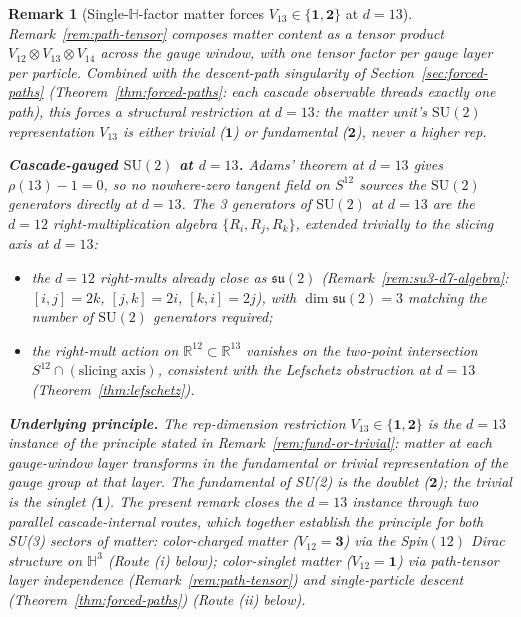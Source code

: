 \documentclass[12pt,a4paper]{article}
\newtheorem{remark}[theorem]{Remark}
\begin{document}
\begin{remark}[Single-$\mathbb{H}$-factor matter forces $V_{13}\in\{\mathbf{1},\mathbf{2}\}$ at $d=13$]\label{rem:single-h-factor}
Remark~\ref{rem:path-tensor} composes matter content as a tensor product
$V_{12}\otimes V_{13}\otimes V_{14}$ across the gauge window, with one
tensor factor per gauge layer per particle. Combined with the
descent-path singularity of Section~\ref{sec:forced-paths}
(Theorem~\ref{thm:forced-paths}: each cascade observable threads exactly
one path), this forces a structural restriction at $d=13$: the matter
unit's $\mathrm{SU}(2)$ representation $V_{13}$ is either trivial
($\mathbf{1}$) or fundamental ($\mathbf{2}$), never a higher rep.

\medskip\noindent\textbf{Cascade-gauged $\mathrm{SU}(2)$ at $d=13$.}
Adams' theorem at $d=13$ gives $\rho(13)-1=0$, so no nowhere-zero
tangent field on $S^{12}$ sources the $\mathrm{SU}(2)$ generators
directly at $d=13$. The 3 generators of $\mathrm{SU}(2)$ at $d=13$ are
the $d=12$ right-multiplication algebra $\{R_i,R_j,R_k\}$, extended
trivially to the slicing axis at $d=13$:
\begin{itemize}
\item the $d=12$ right-mults already close as $\mathfrak{su}(2)$
(Remark~\ref{rem:su3-d7-algebra}: $[i,j]=2k$, $[j,k]=2i$, $[k,i]=2j$),
with $\dim\mathfrak{su}(2)=3$ matching the number of $\mathrm{SU}(2)$
generators required;
\item the right-mult action on $\mathbb{R}^{12}\subset\mathbb{R}^{13}$
vanishes on the two-point intersection $S^{12}\cap(\text{slicing axis})$,
consistent with the Lefschetz obstruction at $d=13$
(Theorem~\ref{thm:lefschetz}).
\end{itemize}

\medskip\noindent\textbf{Underlying principle.}
The rep-dimension restriction $V_{13}\in\{\mathbf{1},\mathbf{2}\}$ is
the $d=13$ instance of the principle stated in
Remark~\ref{rem:fund-or-trivial}: matter at each gauge-window layer
transforms in the fundamental or trivial representation of the gauge
group at that layer. The fundamental of SU(2) is the doublet
($\mathbf{2}$); the trivial is the singlet ($\mathbf{1}$). The
present remark closes the $d=13$ instance through two parallel
cascade-internal routes, which together establish the principle for
both SU(3) sectors of matter: color-charged matter
($V_{12}=\mathbf{3}$) via the Spin$(12)$ Dirac structure on
$\mathbb{H}^3$ (Route (i) below); color-singlet matter
($V_{12}=\mathbf{1}$) via path-tensor layer independence
(Remark~\ref{rem:path-tensor}) and single-particle descent
(Theorem~\ref{thm:forced-paths}) (Route (ii) below).


\end{remark}
\end{document}
